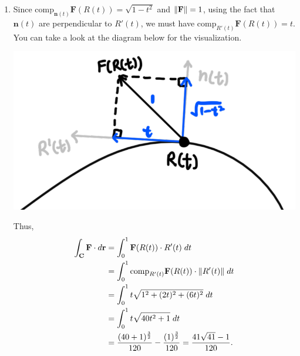 \documentclass{article}
\DeclarePairedDelimiter{\norm}{\lVert}{\rVert}
\begin{document}
\begin{enumerate}
    \vspace{2cm}
    \item Since $\text{comp}_{\textbf{n}(t)}\textbf{F}(R(t)) = \sqrt{1 - t^2}$ and $\norm{\textbf{F}} = 1$, using the fact that $\textbf{n}(t)$ are perpendicular to $R'(t)$, we must have $\text{comp}_{R'(t)}\textbf{F}(R(t)) = t$. You can take a look at the diagram below for the visualization. 
    \begin{center}
        \includegraphics[scale=0.5]{q3.png}
    \end{center}
    Thus,
    \begin{align*}
        \int_\textbf{C} \textbf{F}\cdot d\textbf{r} &= \int_0^1 \textbf{F}(R(t))\cdot R'(t) \hspace{1mm}dt\\
        &= \int_0^1 \text{comp}_{R'(t)}\textbf{F}(R(t)) \cdot \norm{R'(t)} \hspace{1mm}dt\\
        &= \int_0^1 t\sqrt{1^2 + (2t)^2 + (6t)^2} \hspace{1mm}dt\\
        &= \int_0^1 t\sqrt{40t^2 + 1} \hspace{1mm}dt\\
        &=\frac{(40+1)^{\frac{3}{2}}}{120} - \frac{(1)^{\frac{3}{2}}}{120} = \frac{41\sqrt{41}-1}{120}.
    \end{align*}
    

\end{enumerate}
\end{document}
